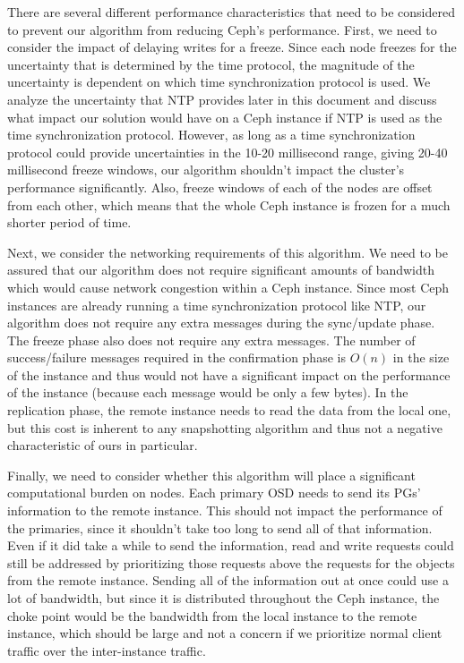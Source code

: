 There are several different performance characteristics that need to
be considered to prevent our algorithm from reducing Ceph's
performance. First, we need to consider the impact of delaying writes
for a freeze. Since each node freezes for the uncertainty that is
determined by the time protocol, the magnitude of the uncertainty is
dependent on which time synchronization protocol is used. We analyze
the uncertainty that NTP provides later in this document and discuss
what impact our solution would have on a Ceph instance if NTP is used
as the time synchronization protocol. However, as long as a time
synchronization protocol could provide uncertainties in the 10-20
millisecond range, giving 20-40 millisecond freeze windows, our
algorithm shouldn't impact the cluster's performance
significantly. Also, freeze windows of each of the nodes are offset
from each other, which means that the whole Ceph instance is frozen
for a much shorter period of time.

Next, we consider the networking requirements of this algorithm. We
need to be assured that our algorithm does not require significant
amounts of bandwidth which would cause network congestion within a
Ceph instance. Since most Ceph instances are already running a time
synchronization protocol like NTP, our algorithm does not require any
extra messages during the sync/update phase. The freeze phase also
does not require any extra messages. The number of success/failure
messages required in the confirmation phase is $O(n)$ in the size of
the instance and thus would not have a significant impact on the
performance of the instance (because each message would be only a few
bytes). In the replication phase, the remote instance needs to read
the data from the local one, but this cost is inherent to any
snapshotting algorithm and thus not a negative characteristic of ours
in particular.

Finally, we need to consider whether this algorithm will place a
significant computational burden on nodes. Each primary OSD needs to
send its PGs' information to the remote instance. This should not
impact the performance of the primaries, since it shouldn't take too
long to send all of that information. Even if it did take a while to
send the information, read and write requests could still be addressed
by prioritizing those requests above the requests for the objects from
the remote instance. Sending all of the information out at once could
use a lot of bandwidth, but since it is distributed throughout the
Ceph instance, the choke point would be the bandwidth from the local
instance to the remote instance, which should be large and not
a concern if we prioritize normal client traffic over the
inter-instance traffic.

